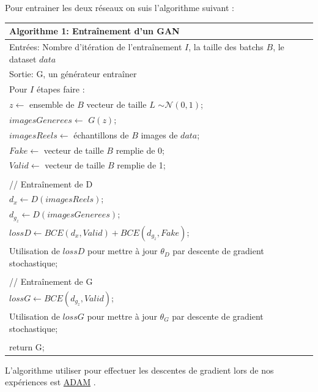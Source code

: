 \documentclass[11pt,francais]{article}
\begin{document}
Pour entrainer les deux réseaux on suis l'algorithme suivant :
\begin{table}[hb]
  \begin{tabular}{l}
  \hline
  Algorithme 1: Entraînement d'un GAN\tabularnewline
  \hline
  Entrées: Nombre d'itération de l'entraînement  \(I\), la taille des batchs \(B\), le dataset \(data\)  \tabularnewline
  Sortie: G, un générateur entraîner \tabularnewline
  \hline
  Pour \(I\) étapes faire :\tabularnewline 
  \hspace{1cm}\(z \leftarrow\) ensemble de \(B\) vecteur de taille \(L\) \(\sim \mathcal{N}(0,1)\);\tabularnewline
  \hspace{1cm}\(imagesGenerees \leftarrow\) \(G(z)\);\tabularnewline  
  \hspace{1cm}\(imagesReels \leftarrow\) échantillons de \(B\) images de \(data\);\tabularnewline
  \hspace{1cm}\(Fake \leftarrow\) vecteur de taille \(B\) remplie de 0;\tabularnewline
  \hspace{1cm}\(Valid \leftarrow\) vecteur de taille \(B\) remplie de 1;\tabularnewline
  \tabularnewline
  \hspace{1cm}// Entraînement de D\tabularnewline
  \hspace{1cm}\(d_x \leftarrow D(imagesReels)\);\tabularnewline
  \hspace{1cm}\(d_{g_z} \leftarrow D(imagesGenerees)\);\tabularnewline
  \hspace{1cm}\(lossD \leftarrow BCE(d_x,Valid) + BCE(d_{g_z},Fake)\);\tabularnewline
  \hspace{1cm}Utilisation de \(lossD\) pour mettre à jour \(\theta_D\) par descente de gradient stochastique;\tabularnewline
  \tabularnewline
  \hspace{1cm}// Entraînement de G\tabularnewline
  \hspace{1cm}\(lossG\leftarrow BCE(d_{g_z},Valid)\);\tabularnewline
  \hspace{1cm}Utilisation de \(lossG\) pour mettre à jour \(\theta_G\) par descente de gradient stochastique;\tabularnewline
  \tabularnewline
  return G;\tabularnewline
  \hline
  \end{tabular}
  \label{tab:tab1}
\end{table}

L'algorithme utiliser pour effectuer les descentes de gradient lors de nos expériences est \href{https://arxiv.org/pdf/1412.6980.pdf}{ADAM} \cite{kingma2014adam}.\\
\end{document}
